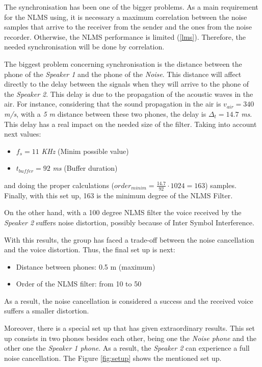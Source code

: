 \documentclass[11pt,a4paper,english]{book}  %
\theoremstyle{definition}  %
\theoremstyle{plain}  %
\theoremstyle{remark}  %
\begin{document}
The synchronisation has been one of the bigger problems. As a main requirement for the NLMS using, it is necessary a maximum correlation between the noise samples that arrive to the receiver from the sender and the ones from the noise recorder. Otherwise, the NLMS performance is limited (\ref{lms}). Therefore, the needed synchronisation will be done by correlation.

The biggest problem concerning synchronisation is the distance between the phone of the \textit{Speaker 1} and the phone of the \textit{Noise}. This distance will affect directly to the delay between the signals when they will arrive to the phone of the \textit{Speaker 2}. This delay is due to the propagation of the acoustic waves in the air. For instance, considering that the sound propagation in the air is $v_{air}=340$ \textit{m/s}, with a \textit{5 m} distance between these two phones, the delay is $\Delta_{t}=14.7$ \textit{ms}. This delay has a real impact on the needed size of the filter. Taking into account next values:

\begin{itemize}
\item $f_{s}=11$ \textit{KHz} (Minim possible value)
\item $t_{buffer}=92$ \textit{ms} (Buffer duration)
\end{itemize}

and doing the proper calculations ($order_{minim}=\frac{14.7}{92} \cdot 1024=163$) samples. Finally, with this set up, 163 is the minimum degree of the NLMS Filter.

On the other hand, with a 100 degree NLMS filter the voice received by the \textit{Speaker 2} suffers noise distortion, possibly because of Inter Symbol Interference.

With this results, the group has faced a trade-off between the noise cancellation and the voice distortion. Thus, the final set up is next:

\begin{itemize}
\item Distance between phones: 0.5 m (maximum)
\item Order of the NLMS filter: from 10 to 50
\end{itemize}

As a result, the noise cancellation is considered a success and the received voice suffers a smaller distortion.

Moreover, there is a special set up that has given extraordinary results. This set up consists in two phones besides each other, being one the \textit{Noise phone} and the other one the \textit{Speaker 1 phone}. As a result, the \textit{Speaker 2} can experience a full noise cancellation. The Figure \ref{fig:setup} shows the mentioned set up.
\end{document}

